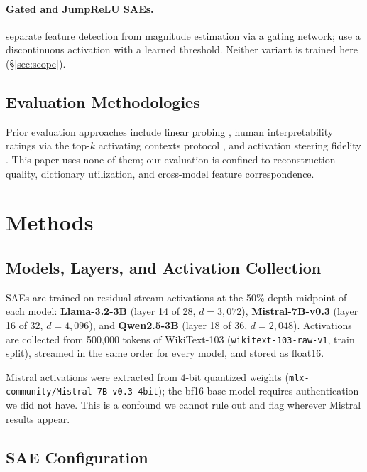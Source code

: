 \documentclass[11pt]{article}
\begin{document}
\paragraph{Gated and JumpReLU SAEs.}
\citet{rajamanoharan2024gated} separate feature detection from magnitude estimation via
a gating network; \citet{rajamanoharan2024jumprelu} use a discontinuous activation with
a learned threshold. Neither variant is trained here (\S\ref{sec:scope}).

\subsection{Evaluation Methodologies}

Prior evaluation approaches include linear probing
\citep{alain2016understanding,belinkov2022probing,cunningham2023sparse}, human
interpretability ratings via the top-$k$ activating contexts protocol
\citep{bricken2023monosemanticity}, and activation steering fidelity
\citep{turner2023activation,zou2023representation}. This paper uses none of them; our
evaluation is confined to reconstruction quality, dictionary utilization, and
cross-model feature correspondence.

\section{Methods}
\label{sec:methods}

\subsection{Models, Layers, and Activation Collection}

SAEs are trained on residual stream activations at the 50\% depth midpoint of each
model: \textbf{Llama-3.2-3B} (layer 14 of 28, $d = 3{,}072$), \textbf{Mistral-7B-v0.3}
(layer 16 of 32, $d = 4{,}096$), and \textbf{Qwen2.5-3B} (layer 18 of 36,
$d = 2{,}048$). Activations are collected from 500{,}000 tokens of WikiText-103
(\texttt{wikitext-103-raw-v1}, train split), streamed in the same order for every
model, and stored as float16.

Mistral activations were extracted from 4-bit quantized weights
(\texttt{mlx-community/\allowbreak Mistral-7B-v0.3-4bit}); the bf16 base model requires
authentication we did not have. This is a confound we cannot rule out and flag wherever
Mistral results appear.

\subsection{SAE Configuration}
\end{document}
